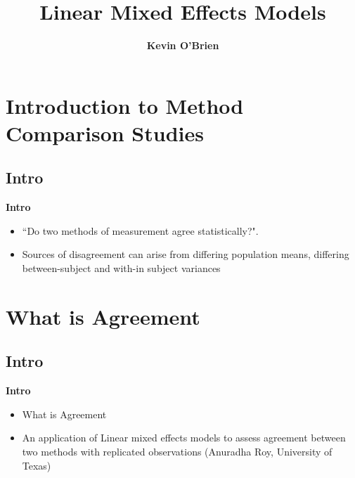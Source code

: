 \documentclass[compress]{beamer}        %
\title
{
{\huge Linear Mixed Effects Models\\[0.3cm] }
}
\author[Kevin O'Brien]{{\bf Kevin O'Brien}}
\institute[University of Limerick, Maths \& Stats Dept]{}
\date{}
\makeatletter
\newcommand{\tcb}{\textcolor{beamer@blendedblue}}
\makeatother
\begin{document}
\begin{frame}
\vspace{-0.4cm}
\titlepage
\end{frame}




\section[Intro to MCS]{Introduction to Method Comparison Studies}
\subsection{Intro}
\begin{frame}{\bf \tcb{Intro}}
\begin{itemize}\itemsep0.7cm
\item ``Do two methods of measurement agree statistically?".
\item Sources of disagreement can arise from differing population means, differing between-subject and with-in subject variances
\end{itemize}
\end{frame}

\section[Agreement]{What is Agreement}
\subsection{Intro}
\begin{frame}{\bf \tcb{Intro}}
\begin{itemize}\itemsep0.7cm
\item What is Agreement
\item An application of Linear mixed effects models to assess agreement between two methods with replicated observations     (Anuradha Roy, University of Texas)
\end{itemize}
\end{frame}
\end{document}
